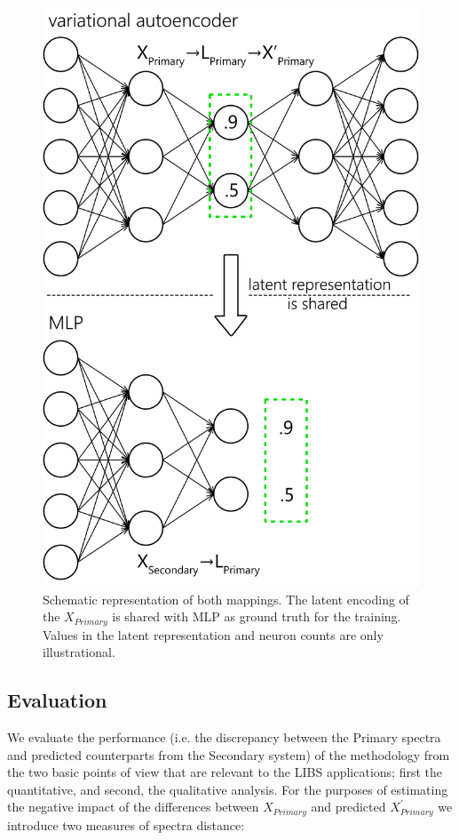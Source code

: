 \documentclass[preprint,11pt]{elsarticle}
\begin{document}
\begin{figure}[!htb]
    \centering
    \includegraphics[height=0.5\textheight]{schema2.png}
    \caption{Schematic representation of both mappings. The latent encoding of the $X_{Primary}$ is shared with MLP as ground truth for the training. Values in the latent representation and neuron counts are only illustrational.}
    \label{fig:schema2}
\end{figure}



\subsection{Evaluation}
\label{sec:Eval}
\noindent
We evaluate the performance (i.e. the discrepancy between the Primary spectra and predicted counterparts from the Secondary system) of the methodology from the two basic points of view that are relevant to the LIBS applications; first the quantitative, and second, the qualitative analysis. For the purposes of estimating the negative impact of the differences between $X_{Primary}$ and predicted  $X_{Primary}^{\prime}$ we introduce two measures of spectra distance:
\end{document}
